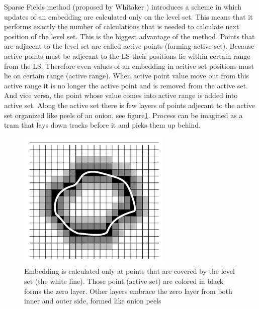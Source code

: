 Sparse Fields method (proposed by Whitaker \cite{sparseFilelds}) introduces a scheme in which updates of an embedding are calculated only on the level set. This means that it performs exactly the number of calculations that is needed to calculate next position of the level set. This is the biggest advantage of the method. Points that are adjacent to the level set are called active points (forming active set). Because active points must be adjecant to the LS their positions lie within certain range from the LS. Therefore even values of an embedding in acitive set positions must lie on certain range (active range). When active point value move out from this active range it is no longer the active point and is removed from the active set. And vice versa, the point whose value comes into active range is added into active set. Along the active set there is few layers of points adjecant to the active set organized like peels of an onion, see figure\ref{fg:sparseFilelds}. Process can be imagined as a tram that lays down tracks before it and picks them up behind.

\begin{figure}
    \centering
    \includegraphics[width=\textwidth]{data/sparsefield}
    \caption[Sparse fields method computation illustration]{Embedding is calculated only at points that are covered by the level set (the white line). Those point (active set) are colored in black forms the zero layer. Other layers embrace the zero layer from both inner and outer side, formed like onion peels}
    \label{fg:sparseFilelds}
\end{figure}


